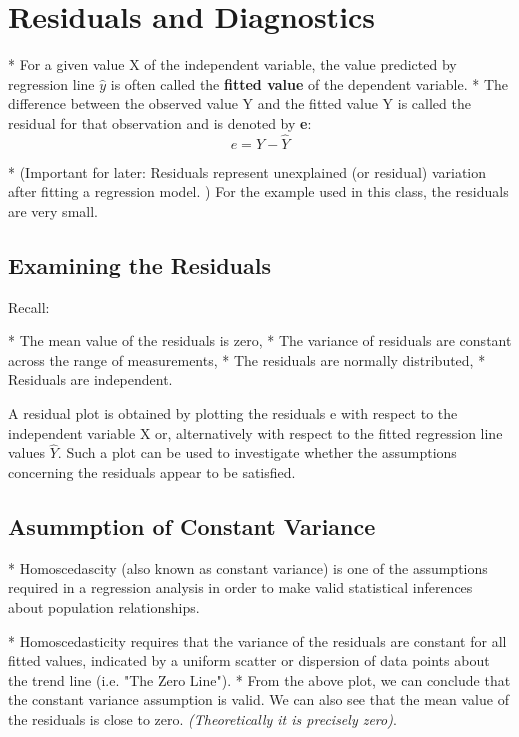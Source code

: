 \documentclass{article}
\begin{document}
	\tableofcontents







\section{Residuals and Diagnostics}

* For a given value X of the independent variable, the value predicted by regression line $\hat{y}$ is often called the \textbf{fitted
	value} of the dependent variable. 
* The difference between the observed value Y and the fitted value Y
is called the residual for that observation and is denoted by \textbf{e}:
\[e= Y-\hat{Y}\]

* (Important for later: Residuals represent unexplained (or residual) variation after fitting a regression
model. )
For the example used in this class, the residuals are very small.



\subsection{Examining the Residuals}

Recall: 

* The mean value of the residuals is zero,
* The variance of residuals are constant across the range of measurements,
* The residuals are normally distributed,
* Residuals are independent.

 
A residual plot is obtained by plotting the residuals e with respect to the independent variable X or,
alternatively with respect to the fitted regression line values $\hat{Y}$. Such a plot can be used to
investigate whether the assumptions concerning the residuals appear to be satisfied.

\subsection{Asummption of Constant Variance}

* Homoscedascity (also known as constant variance) is one of the assumptions required in a
regression analysis in order to make valid statistical inferences about population relationships.

* Homoscedasticity requires that the variance of the residuals are constant for all fitted values,
indicated by a uniform scatter or dispersion of data points about the trend line (i.e. "The Zero Line").
* From the above plot, we can conclude that the constant variance assumption is valid. We can also
see that the mean value of the residuals is close to zero. \textit{(Theoretically it is precisely zero)}.
\end{document}
